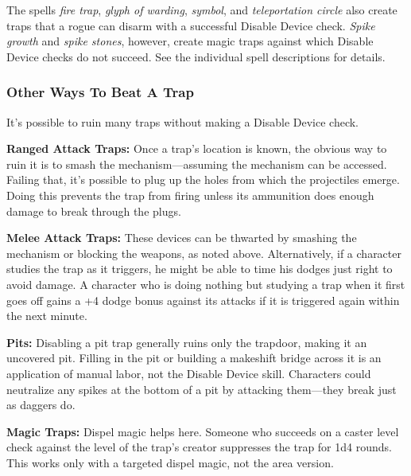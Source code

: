 The spells \emph{fire trap}, \emph{glyph of warding}, \emph{symbol}, and \emph{teleportation circle} also create traps that a rogue can disarm with a successful Disable Device check. \emph{Spike growth} and \emph{spike stones}, however, create magic traps against which Disable Device checks do not succeed. See the individual spell descriptions for details.

\subsubsection{Other Ways To Beat A Trap}
It’s possible to ruin many traps without making a Disable Device check.

\textbf{Ranged Attack Traps:} Once a trap’s location is known, the obvious way to ruin it is to smash the mechanism---assuming the mechanism can be accessed. Failing that, it’s possible to plug up the holes from which the projectiles emerge. Doing this prevents the trap from firing unless its ammunition does enough damage to break through the plugs.

\textbf{Melee Attack Traps:} These devices can be thwarted by smashing the mechanism or blocking the weapons, as noted above. Alternatively, if a character studies the trap as it triggers, he might be able to time his dodges just right to avoid damage. A character who is doing nothing but studying a trap when it first goes off gains a +4 dodge bonus against its attacks if it is triggered again within the next minute.

\textbf{Pits:} Disabling a pit trap generally ruins only the trapdoor, making it an uncovered pit. Filling in the pit or building a makeshift bridge across it is an application of manual labor, not the Disable Device skill. Characters could neutralize any spikes at the bottom of a pit by attacking them---they break just as daggers do.

\textbf{Magic Traps:} Dispel magic helps here. Someone who succeeds on a caster level check against the level of the trap’s creator suppresses the trap for 1d4 rounds. This works only with a targeted dispel magic, not the area version.